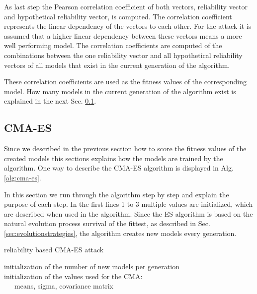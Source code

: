 As last step the Pearson correlation coefficient of both vectors, reliability vector and hypothetical reliability vector, is computed.
The correlation coefficient represents the linear dependency of the vectors to each other.
For the attack it is assumed that a higher linear dependency between these vectors means a more well performing model. %
The correlation coefficients are computed of the combinations between the one reliability vector and all hypothetical reliability vectors of all models that exist in the current generation of the algorithm.

These correlation coefficients are used as the fitness values of the corresponding model.
How many models in the current generation of the algorithm exist is explained in the next Sec. \ref{sec:cma-esdesign}.


\subsection{CMA-ES}
\label{sec:cma-esdesign}

Since we described in the previous section how to score the fitness values of the created models this sections explains how the models are trained by the algorithm.
One way to describe the \ac{CMA-ES} algorithm is displayed in Alg. \ref{alg:cma-es}.

In this section we run through the algorithm step by step and explain the purpose of each step. %
In the first lines 1 to 3 multiple values are initialized, which are described when used in the algorithm.
Since the \ac{ES} algorithm is based on the natural evolution process survival of the fittest, as described in Sec. \ref{sec:evolutionstrategies}, the algorithm creates new models every generation. %

\SetAlCapHSkip{0.2em}
\begin{algorithm}[H] %
\Indm
\SetAlgoLined
\caption{reliability based \acl{CMA-ES} attack}
\label{alg:cma-es}
\Indp

initialization of the number of new models per generation\\
initialization of the values used for the \ac{CMA}:\\
\ \ \ means, sigma, covariance matrix\\
\end{algorithm}

